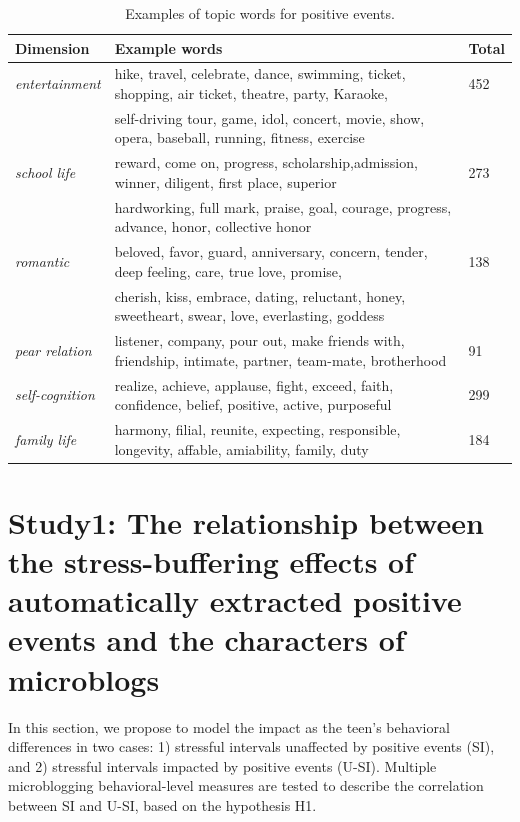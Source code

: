 \begin{table}
\centering
\caption{\small{Examples of topic words for positive events.}}
\label{tab:keyWords}
\small{
\begin{tabular}{lll}
\toprule
Dimension & Example words & Total \\ \midrule
\emph{entertainment}  & hike, travel, celebrate, dance, swimming, ticket, shopping, air ticket, theatre, party, Karaoke,& 452\\
                      & self-driving tour, game, idol, concert, movie, show, opera, baseball, running, fitness, exercise & \\
\emph{school life}    & reward, come on, progress, scholarship,admission, winner, diligent, first place, superior & 273\\
				      & hardworking, full mark,  praise, goal, courage, progress, advance, honor, collective honor& \\
\emph{romantic}       &  beloved, favor, guard, anniversary,  concern, tender, deep feeling, care, true love, promise, & 138\\
				      & cherish, kiss, embrace, dating, reluctant, honey, sweetheart, swear, love, everlasting, goddess &\\
\emph{pear relation}  & listener, company, pour out, make friends with, friendship, intimate, partner, team-mate, brotherhood& 91\\
\emph{self-cognition} & realize, achieve, applause, fight, exceed, faith, confidence, belief, positive, active, purposeful & 299\\
\emph{family life}    & harmony, filial, reunite, expecting, responsible, longevity, affable, amiability, family, duty & 184\\
\bottomrule
\end{tabular}}
\end{table}

\section{Study1: The relationship between the stress-buffering effects of automatically extracted positive events and the characters of microblogs}
In this section,
we propose to model the impact as the teen's behavioral differences in two cases:
1) stressful intervals unaffected by positive events (SI),
and 2) stressful intervals impacted by positive events (U-SI).
Multiple microblogging behavioral-level measures are tested to describe the correlation between SI and U-SI,
based on the hypothesis H1.


